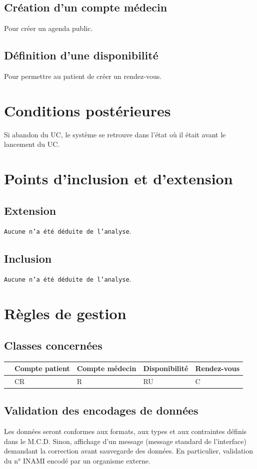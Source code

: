 \documentclass[a4paper, 11pt]{report}
\begin{document}
\subsection{Création d'un compte médecin}
Pour créer un agenda public.
\subsection{Définition d'une disponibilité}
Pour permettre au patient de créer un rendez-vous.

\section{Conditions postérieures}
Si abandon du UC, le système se retrouve dans l’état où il était avant le
lancement du UC.
\newpage

\section{Points d'inclusion et d'extension}
\subsection{Extension}
\texttt{Aucune n'a été déduite de l'analyse}.
\subsection{Inclusion}
\texttt{Aucune n'a été déduite de l'analyse}.
\newpage

\section{Règles de gestion}
\subsection{Classes concernées}
\begin{center}
	\begin{longtable}{|p{2.2cm}|p{2.2cm}|p{2.2cm}|p{2.2cm}|}
		\hline
		& Compte patient & Compte médecin & Disponibilité & Rendez-vous \\
		\hline
		& CR & R & RU & C \\
		\hline
	\end{longtable}
\end{center}
\subsection{Validation des encodages de données}
Les données seront conformes aux formats, aux types et aux contraintes définis
dans le M.C.D. Sinon, affichage d’un message (message standard de l’interface) 
demandant la correction avant sauvegarde des données.
En particulier, validation du n° INAMI encodé par un organisme externe.
\end{document}
